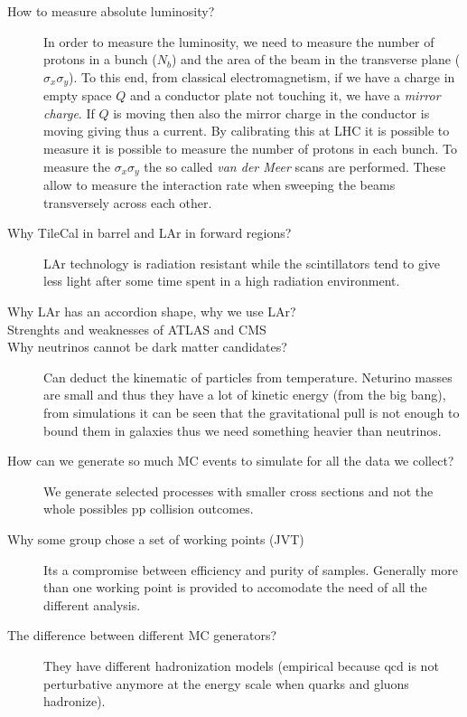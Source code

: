\documentclass[a4paper,10pt,twoside,notitlepage]{article}
\begin{document}
\begin{description}
\item[How to measure absolute luminosity?] In order to measure the luminosity,
  we need to measure the number of protons in a bunch ($N_b$) and the area of
  the beam in the transverse plane ($\sigma_x \sigma_y$). To this end, from
  classical electromagnetism, if we have a charge in empty space $Q$ and a
  conductor plate not touching it, we have a \emph{mirror charge}. If $Q$ is
  moving then also the mirror charge in the conductor is moving giving thus a
  current. By calibrating this at LHC it is possible to measure it is possible
  to measure the number of protons in each bunch. To measure the
  $\sigma_x \sigma_y$ the so called \emph{van der Meer} scans are
  performed. These allow to measure the interaction rate when sweeping the beams
  transversely across each other.

\item[Why TileCal in barrel and LAr in forward regions?] LAr technology is
  radiation resistant while the scintillators tend to give less light after some
  time spent in a high radiation environment.

\item[Why LAr has an accordion shape, why we use LAr?]

\item[Strenghts and weaknesses of ATLAS and CMS]

\item[Why neutrinos cannot be dark matter candidates?] Can deduct the kinematic
  of particles from temperature. Neturino masses are small and thus they have a
  lot of kinetic energy (from the big bang), from simulations it can be seen
  that the gravitational pull is not enough to bound them in galaxies thus we
  need something heavier than neutrinos.

\item[How can we generate so much MC events to simulate for all the data we
  collect?] We generate selected processes with smaller cross sections and not
  the whole possibles pp collision outcomes.

\item[Why some group chose a set of working points (JVT)] Its a compromise
  between efficiency and purity of samples. Generally more than one working
  point is provided to accomodate the need of all the different analysis.

\item[The difference between different MC generators?] They have different
  hadronization models (empirical because qcd is not perturbative anymore at the
  energy scale when quarks and gluons hadronize).


\end{description}
\end{document}
